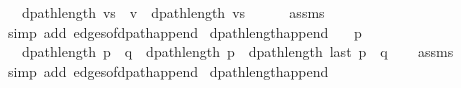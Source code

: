 \begin{isabellebody}
\ \ \ {\isachardoublequoteopen}dpath{\isacharunderscore}{\kern0pt}length\ {\isacharparenleft}{\kern0pt}vs\ {\isacharat}{\kern0pt}\ {\isacharbrackleft}{\kern0pt}v{\isacharbrackright}{\kern0pt}{\isacharparenright}{\kern0pt}\ {\isacharequal}{\kern0pt}\ dpath{\isacharunderscore}{\kern0pt}length\ vs\ {\isacharplus}{\kern0pt}\ {}{\isachardoublequoteclose}%
\endisataginvisible
{\isafoldinvisible}%
%
\isadeliminvisible
\isanewline
%
\endisadeliminvisible
%
\isadelimproof
\ \ %
\endisadelimproof
%
\isatagproof
{}\isamarkupfalse%
\ assms\isanewline
\ \ \isamarkupfalse%
\ {\isacharparenleft}{\kern0pt}simp\ add{\isacharcolon}{\kern0pt}\ edges{\isacharunderscore}{\kern0pt}of{\isacharunderscore}{\kern0pt}dpath{\isacharunderscore}{\kern0pt}append{\isacharunderscore}{\kern0pt}{}{\isacharparenright}{\kern0pt}%
\endisatagproof
{\isafoldproof}%
%
\isadelimproof
\isanewline
%
\endisadelimproof
%
\isadeliminvisible
\isanewline
%
\endisadeliminvisible
%
\isataginvisible
{}\isamarkupfalse%
\ dpath{\isacharunderscore}{\kern0pt}length{\isacharunderscore}{\kern0pt}append{\isacharcolon}{\kern0pt}\isanewline
\ \ \ {\isachardoublequoteopen}p\ {\isasymnoteq}\ {\isacharbrackleft}{\kern0pt}{\isacharbrackright}{\kern0pt}{\isachardoublequoteclose}\isanewline
\ \ \ {\isachardoublequoteopen}dpath{\isacharunderscore}{\kern0pt}length\ {\isacharparenleft}{\kern0pt}p\ {\isacharat}{\kern0pt}\ q{\isacharparenright}{\kern0pt}\ {\isacharequal}{\kern0pt}\ dpath{\isacharunderscore}{\kern0pt}length\ p\ {\isacharplus}{\kern0pt}\ dpath{\isacharunderscore}{\kern0pt}length\ {\isacharparenleft}{\kern0pt}last\ p\ {\isacharhash}{\kern0pt}\ q{\isacharparenright}{\kern0pt}{\isachardoublequoteclose}%
\endisataginvisible
{\isafoldinvisible}%
%
\isadeliminvisible
\isanewline
%
\endisadeliminvisible
%
\isadelimproof
\ \ %
\endisadelimproof
%
\isatagproof
{}\isamarkupfalse%
\ assms\isanewline
\ \ \isamarkupfalse%
\ {\isacharparenleft}{\kern0pt}simp\ add{\isacharcolon}{\kern0pt}\ edges{\isacharunderscore}{\kern0pt}of{\isacharunderscore}{\kern0pt}dpath{\isacharunderscore}{\kern0pt}append{\isacharunderscore}{\kern0pt}{}{\isacharparenright}{\kern0pt}%
\endisatagproof
{\isafoldproof}%
%
\isadelimproof
\isanewline
%
\endisadelimproof
%
\isadeliminvisible
\isanewline
%
\endisadeliminvisible
%
\isataginvisible
{}\isamarkupfalse%
\ dpath{\isacharunderscore}{\kern0pt}length{\isacharunderscore}{\kern0pt}append{\isacharunderscore}{\kern0pt}{}{\isacharcolon}{\kern0pt}\isanewline

\end{isabellebody}
